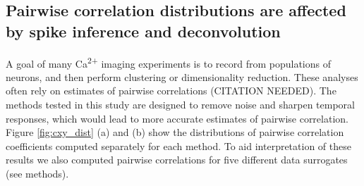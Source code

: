 \documentclass[a4paper,10pt,twocolumn]{article}
\begin{document}


\subsection{Pairwise correlation distributions are affected by spike inference and deconvolution}



A goal of many Ca\textsuperscript{2+} imaging experiments is to record from populations of neurons, and then perform clustering or dimensionality reduction. These analyses often rely on estimates of pairwise correlations (CITATION NEEDED). The methods tested in this study are designed to remove noise and sharpen temporal responses, which would lead to more accurate estimates of pairwise correlation. Figure \ref{fig:cxy_dist} (a) and (b) show the distributions of pairwise correlation coefficients computed separately for each method. To aid interpretation of these results we also computed pairwise correlations for five different data surrogates (see methods).
\end{document}
